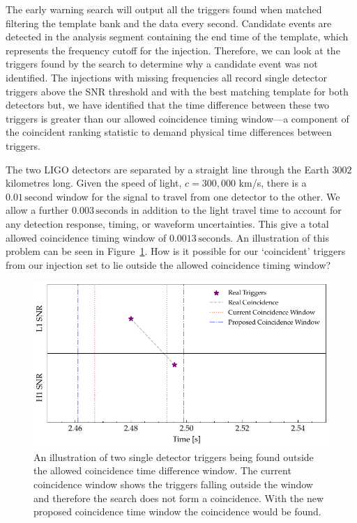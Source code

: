 The early warning search will output all the triggers found when matched filtering the template bank and the data every second. Candidate events are detected in the analysis segment containing the end time of the template, which represents the frequency cutoff for the injection. Therefore, we can look at the triggers found by the search to determine why a candidate event was not identified. The injections with missing frequencies all record single detector triggers above the SNR threshold and with the best matching template for both detectors but, we have identified that the time difference between these two triggers is greater than our allowed coincidence timing window---a component of the coincident ranking statistic to demand physical time differences between triggers.

The two LIGO detectors are separated by a straight line through the Earth $3002$ kilometres long. Given the speed of light, $c = 300,000$ km/s, there is a $0.01 \, \text{second}$ window for the \gwadj signal to travel from one detector to the other. We allow a further $0.003 \, \text{seconds}$ in addition to the light travel time to account for any detection response, timing, or waveform uncertainties. This give a total allowed coincidence timing window of $0.0013 \, \text{seconds}$. An illustration of this problem can be seen in Figure~\ref{6:fig:outside_coinc_window}. How is it possible for our `coincident' triggers from our injection set to lie outside the allowed coincidence timing window?
%
\begin{figure}
    \centering
    \includegraphics[width=\textwidth]{images/6_earlywarning/identified-problems/outside_coinc_window.pdf}
    \caption{An illustration of two single detector triggers being found outside the allowed coincidence time difference window. The current coincidence window shows the triggers falling outside the window and therefore the search does not form a coincidence. With the new proposed coincidence time window the coincidence would be found.}
    \label{6:fig:outside_coinc_window}
\end{figure}
%

